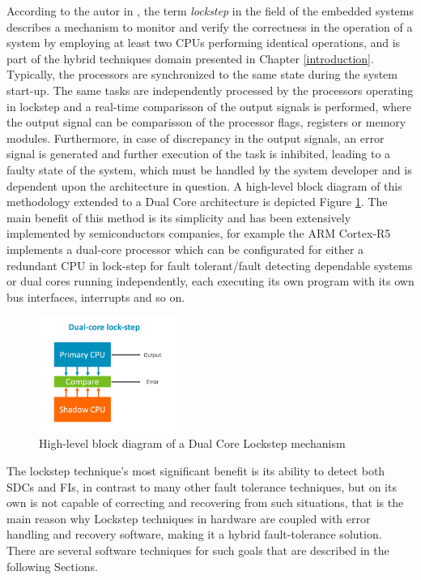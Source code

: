 \documentclass[10pt, a4paper]{report}
\begin{document}
According to the autor in \cite{lockstep_analysis_thesis}, the term
\emph{lockstep} in the field of the embedded systems describes a mechanism to 
monitor and verify the correctness in the operation of a system by employing at 
least two \acrshort{CPU}s performing identical operations, and is part of the 
hybrid techniques domain presented in Chapter \ref{introduction}. 
Typically, the processors are synchronized to the same state during the system 
start-up. The same tasks are independently processed by the processors operating 
in lockstep and a real-time comparisson of the output signals is performed, 
where the output signal can be comparisson of the processor flags, registers or 
memory modules. Furthermore, in case of discrepancy in the output signals, an 
error signal is generated and further execution of the task is inhibited, 
leading to a faulty state of the system, which must be handled by the system
developer and is dependent upon the architecture in question. A high-level block 
diagram of this methodology extended to a Dual Core architecture is depicted 
Figure \ref{lockstep_diagram}. The main benefit of this method is its simplicity
and has been extensively implemented by semiconductors companies, for example
the ARM Cortex-R5 implements a dual-core processor which can be configurated for
either a redundant CPU in lock-step for fault tolerant/fault detecting
dependable systems or dual cores running independently, each executing its own
program with its own bus interfaces, interrupts and so on.

\begin{figure}[h!]
    \begin{center}
        \includegraphics[width=0.4\textwidth]{lockstep_diagram.png}
        \caption{High-level block diagram of a Dual Core Lockstep mechanism}
        \label{lockstep_diagram}
    \end{center}
\end{figure}

The lockstep technique's most significant benefit is its ability to detect both
\acrshort{SDC}s and \acrshort{FI}s, in contrast to many other fault tolerance
techniques, but on its own is not capable of correcting and recovering from such
situations, that is the main reason why Lockstep techniques in hardware are
coupled with error handling and recovery software, making it a hybrid
fault-tolerance solution. There are several software techniques for such goals
that are described in the following Sections.
\end{document}
